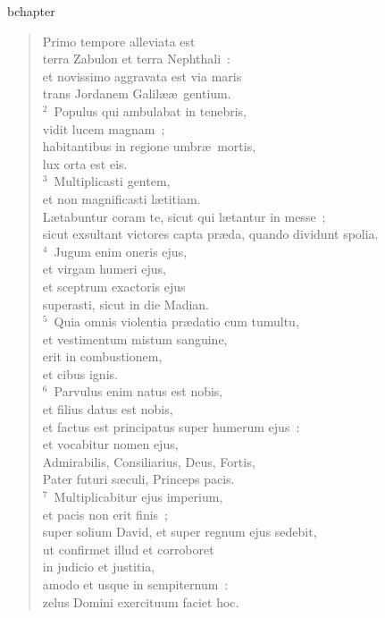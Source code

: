 bchapter\begin{verse}\vspace{-19pt}Primo tempore alleviata est\\ terra Zabulon et terra Nephthali~:\\ et novissimo aggravata est via maris\\ trans Jordanem Galil\ae \ae\ gentium.\\
${}^{2}$~Populus qui ambulabat in tenebris,\\ vidit lucem magnam~;\\ habitantibus in regione umbr\ae\ mortis,\\ lux orta est eis.\\
${}^{3}$~Multiplicasti gentem,\\ et non magnificasti l\ae titiam.\\ L\ae tabuntur coram te, sicut qui l\ae tantur in messe~;\\ sicut exsultant victores capta pr\ae da, quando dividunt spolia.\\
${}^{4}$~Jugum enim oneris ejus,\\ et virgam humeri ejus,\\ et sceptrum exactoris ejus\\ superasti, sicut in die Madian.\\
${}^{5}$~Quia omnis violentia pr\ae datio cum tumultu,\\ et vestimentum mistum sanguine,\\ erit in combustionem,\\ et cibus ignis.\\
${}^{6}$~Parvulus enim natus est nobis,\\ et filius datus est nobis,\\ et factus est principatus super humerum ejus~:\\ et vocabitur nomen ejus,\\ Admirabilis, Consiliarius, Deus, Fortis,\\ Pater futuri s\ae culi, Princeps pacis.\\
${}^{7}$~Multiplicabitur ejus imperium,\\ et pacis non erit finis~;\\ super solium David, et super regnum ejus sedebit,\\ ut confirmet illud et corroboret\\ in judicio et justitia,\\ amodo et usque in sempiternum~:\\ zelus Domini exercituum faciet hoc.\end{verse}


